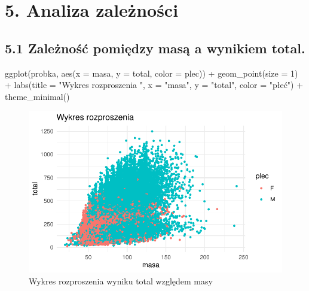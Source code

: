 \documentclass[
  letterpaper,
  DIV=11,
  numbers=noendperiod]{scrartcl}
\newenvironment{Shaded}{\begin{snugshade}}{\end{snugshade}}
\newcommand{\AttributeTok}[1]{\textcolor[rgb]{0.40,0.45,0.13}{#1}}
\newcommand{\DecValTok}[1]{\textcolor[rgb]{0.68,0.00,0.00}{#1}}
\newcommand{\FunctionTok}[1]{\textcolor[rgb]{0.28,0.35,0.67}{#1}}
\newcommand{\NormalTok}[1]{\textcolor[rgb]{0.00,0.23,0.31}{#1}}
\newcommand{\SpecialCharTok}[1]{\textcolor[rgb]{0.37,0.37,0.37}{#1}}
\newcommand{\StringTok}[1]{\textcolor[rgb]{0.13,0.47,0.30}{#1}}
\begin{document}
\hypertarget{analiza-zaleux17cnoux15bci}{%
\section{5. Analiza zależności}\label{analiza-zaleux17cnoux15bci}}

\hypertarget{zaleux17cnoux15bux107-pomiux119dzy-masux105-a-wynikiem-total.}{%
\subsection{5.1 Zależność pomiędzy masą a wynikiem
total.}\label{zaleux17cnoux15bux107-pomiux119dzy-masux105-a-wynikiem-total.}}

\begin{Shaded}
\begin{Highlighting}[]
\FunctionTok{ggplot}\NormalTok{(probka, }\FunctionTok{aes}\NormalTok{(}\AttributeTok{x =}\NormalTok{ masa, }\AttributeTok{y =}\NormalTok{ total, }\AttributeTok{color =}\NormalTok{ plec)) }\SpecialCharTok{+}
  \FunctionTok{geom\_point}\NormalTok{(}\AttributeTok{size =} \DecValTok{1}\NormalTok{) }\SpecialCharTok{+}
  \FunctionTok{labs}\NormalTok{(}\AttributeTok{title =} \StringTok{"Wykres rozproszenia "}\NormalTok{,}
       \AttributeTok{x =} \StringTok{"masa"}\NormalTok{, }\AttributeTok{y =} \StringTok{"total"}\NormalTok{, }\AttributeTok{color =} \StringTok{"płeć"}\NormalTok{) }\SpecialCharTok{+}
  \FunctionTok{theme\_minimal}\NormalTok{()}
\end{Highlighting}
\end{Shaded}

\begin{figure}[H]

{\centering \includegraphics{raport_files/figure-pdf/unnamed-chunk-20-1.pdf}

}

\caption{Wykres rozproszenia wyniku total względem masy}

\end{figure}
\end{document}
